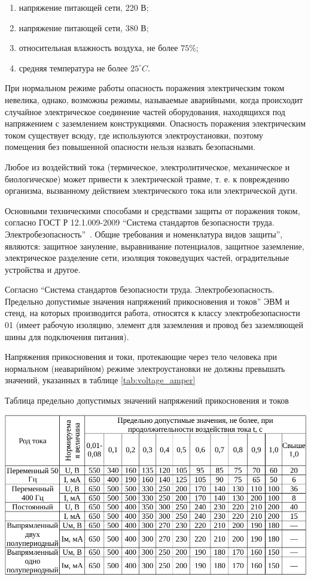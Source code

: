 \begin{enumerate}
\item напряжение питающей сети, 220 В;
\item напряжение питающей сети, 380 В;
\item относительная влажность воздуха, не более $75\%$;
\item средняя температура не более $25^{\circ}C$.
\end{enumerate}
При нормальном режиме работы опасность поражения электрическим током невелика, однако, возможны режимы, называемые аварийными, когда происходит случайное электрическое соединение частей оборудования, находящихся под напряжением с заземлением конструкциями. Опасность поражения электрическим током существует всюду, где используются электроустановки, поэтому помещения без повышенной опасности нельзя назвать безопасными.

Любое из воздействий тока (термическое, электролитическое, механическое и биологическое) может привести к электрической травме, т. е. к повреждению организма, вызванному действием электрического тока или электрической дуги.

Основными техническими способами и средствами защиты от поражения током, согласно ГОСТ Р 12.1.009-2009 ``Система стандартов безопасности труда. Электробезопасность''~\cite{OT11}. Общие требования и номенклатура видов защиты'', являются: защитное зануление, выравнивание потенциалов, защитное заземление, электрическое разделение сети, изоляция токоведущих частей, оградительные устройства и другое.

Согласно ``Система стандартов безопасности труда. Электробезопасность. Предельно допустимые значения напряжений прикосновения и токов'' ЭВМ и стенд, на которых производится работа, относятся к классу электробезопасности 01 (имеет рабочую изоляцию, элемент для заземления и провод без заземляющей шины для подключения питания).

Напряжения прикосновения и токи, протекающие через тело человека при нормальном (неаварийном) режиме электроустановки не должны превышать значений, указанных в таблице \ref{tab:voltage_amper}

\begin{table}[h]
\caption{Таблица предельно допустимых значений напряжений прикосновения и токов}
\centering
\includegraphics[width=1\linewidth]{in-crop.pdf}
\label{tab:voltage_amper}
\end{table}

